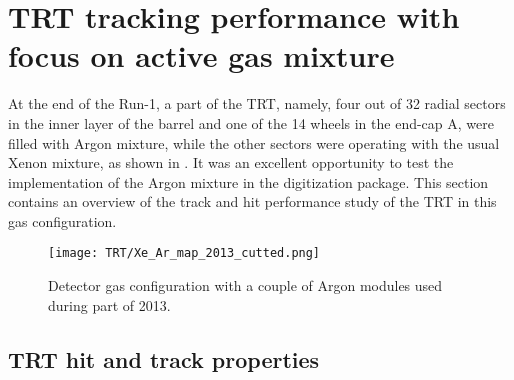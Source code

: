 \section{TRT tracking performance with focus on active gas mixture}
\label{sec:trt_tracking_perf}

At the end of the Run-1, a part of the TRT, namely,
four out of 32 radial sectors in the inner layer of the barrel and one of the 14 wheels in the end-cap A, were filled with Argon mixture, while the other sectors were operating 
with the usual Xenon mixture, as shown in .
It was an excellent opportunity to test the implementation of the Argon mixture in the digitization package.
This section contains an overview of the track and hit performance study of the TRT in this gas configuration.

\begin{figure}[h]
\begin{center}
 \texttt{[image: TRT/Xe\_Ar\_map\_2013\_cutted.png]}
\caption{Detector gas configuration with a couple of Argon modules used during part of 2013.}
\label{fig:argonModulesIn2013}
\end{center}
\end{figure}

\subsection{TRT hit and track properties}

